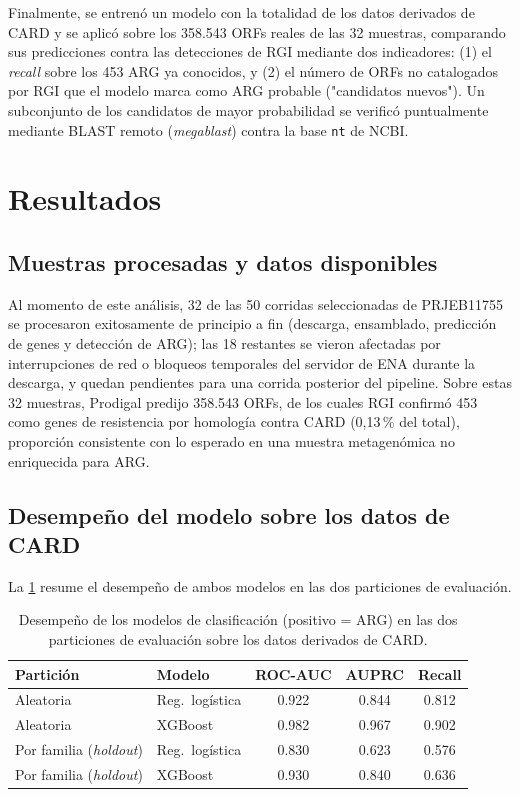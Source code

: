 \documentclass[journal]{vgtc}                     %
\begin{document}
Finalmente, se entrenó un modelo con la totalidad de los datos derivados de CARD y se aplicó sobre los 358.543 ORFs reales de las 32 muestras, comparando sus predicciones contra las detecciones de RGI mediante dos indicadores: (1) el \emph{recall} sobre los 453 ARG ya conocidos, y (2) el número de ORFs no catalogados por RGI que el modelo marca como ARG probable ("candidatos nuevos"). Un subconjunto de los candidatos de mayor probabilidad se verificó puntualmente mediante BLAST remoto (\emph{megablast}) contra la base \texttt{nt} de NCBI.

\section{Resultados}

\subsection{Muestras procesadas y datos disponibles}

Al momento de este análisis, 32 de las 50 corridas seleccionadas de PRJEB11755 se procesaron exitosamente de principio a fin (descarga, ensamblado, predicción de genes y detección de ARG); las 18 restantes se vieron afectadas por interrupciones de red o bloqueos temporales del servidor de ENA durante la descarga, y quedan pendientes para una corrida posterior del pipeline. Sobre estas 32 muestras, Prodigal predijo 358.543 ORFs, de los cuales RGI confirmó 453 como genes de resistencia por homología contra CARD (0,13\,\% del total), proporción consistente con lo esperado en una muestra metagenómica no enriquecida para ARG.

\subsection{Desempeño del modelo sobre los datos de CARD}

La \cref{tab:model_results} resume el desempeño de ambos modelos en las dos particiones de evaluación.

\begin{table}[tb]
  \caption{Desempeño de los modelos de clasificación (positivo = ARG) en las dos particiones de evaluación sobre los datos derivados de CARD.}
  \label{tab:model_results}
  \small
  \centering
  \begin{tabular}{llccc}
    \toprule
    Partición & Modelo & ROC-AUC & AUPRC & Recall \\
    \midrule
    Aleatoria & Reg.\ logística & 0.922 & 0.844 & 0.812 \\
    Aleatoria & XGBoost         & 0.982 & 0.967 & 0.902 \\
    Por familia (\emph{holdout}) & Reg.\ logística & 0.830 & 0.623 & 0.576 \\
    Por familia (\emph{holdout}) & XGBoost         & 0.930 & 0.840 & 0.636 \\
    \bottomrule
  \end{tabular}
\end{table}
\end{document}
